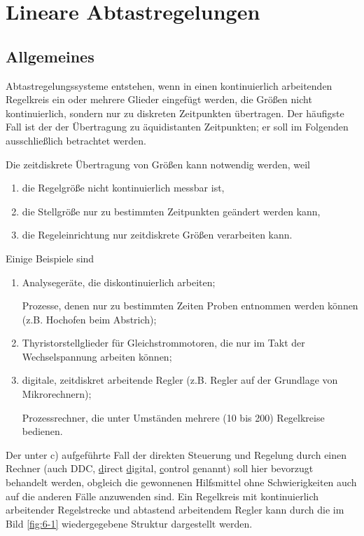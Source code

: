 \section{Lineare Abtastregelungen}


\subsection{Allgemeines}

Abtastregelungssysteme entstehen, wenn in einen kontinuierlich arbeitenden Regelkreis ein oder mehrere Glieder eingefügt werden, die Größen nicht kontinuierlich, sondern nur zu diskreten Zeitpunkten übertragen.
Der häufigste Fall ist der der Übertragung zu äquidistanten Zeitpunkten; er soll im Folgenden ausschließlich betrachtet werden.

Die zeitdiskrete Übertragung von Größen kann notwendig werden, weil
\begin{enumerate}[label=\alph*)]
	\item die Regelgröße nicht kontinuierlich messbar ist,
	\item die Stellgröße nur zu bestimmten Zeitpunkten geändert werden kann,
	\item die Regeleinrichtung nur zeitdiskrete Größen verarbeiten kann.
\end{enumerate}
Einige Beispiele sind
\begin{enumerate}[label=\alph*)]
	\item Analysegeräte, die diskontinuierlich arbeiten;

	Prozesse, denen nur zu bestimmten Zeiten Proben entnommen werden können (z.B. Hochofen beim Abstrich);
	\item Thyristorstellglieder für Gleichstrommotoren, die nur im Takt der Wechselspannung arbeiten können;
	\item\label{enum:6-1:2-c} digitale, zeitdiskret arbeitende Regler (z.B. Regler auf der Grundlage von Mikrorechnern);

	Prozessrechner, die unter Umständen mehrere (10 bis 200) Regelkreise bedienen.
\end{enumerate}
Der unter c) aufgeführte Fall der direkten Steuerung und Regelung durch einen Rechner (auch DDC, \underline{d}irect \underline{d}igital, \underline{c}ontrol genannt) soll hier bevorzugt behandelt werden, obgleich die gewonnenen Hilfsmittel ohne Schwierigkeiten auch auf die anderen Fälle anzuwenden sind.
Ein Regelkreis mit kontinuierlich arbeitender Regelstrecke und abtastend arbeitendem Regler kann durch die im Bild \ref{fig:6-1} wiedergegebene Struktur dargestellt werden.
